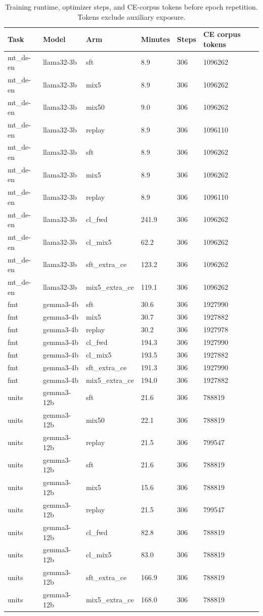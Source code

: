 \begin{table}[t]
\centering\small
\begin{tabular}{llllll}
\toprule
Task & Model & Arm & Minutes & Steps & CE corpus tokens \\
\midrule
mt\_de-en & llama32-3b & sft & 8.9 & 306 & 1096262 \\
mt\_de-en & llama32-3b & mix5 & 8.9 & 306 & 1096262 \\
mt\_de-en & llama32-3b & mix50 & 9.0 & 306 & 1096262 \\
mt\_de-en & llama32-3b & replay & 8.9 & 306 & 1096110 \\
mt\_de-en & llama32-3b & sft & 8.9 & 306 & 1096262 \\
mt\_de-en & llama32-3b & mix5 & 8.9 & 306 & 1096262 \\
mt\_de-en & llama32-3b & replay & 8.9 & 306 & 1096110 \\
mt\_de-en & llama32-3b & cl\_fwd & 241.9 & 306 & 1096262 \\
mt\_de-en & llama32-3b & cl\_mix5 & 62.2 & 306 & 1096262 \\
mt\_de-en & llama32-3b & sft\_extra\_ce & 123.2 & 306 & 1096262 \\
mt\_de-en & llama32-3b & mix5\_extra\_ce & 119.1 & 306 & 1096262 \\
fmt & gemma3-4b & sft & 30.6 & 306 & 1927990 \\
fmt & gemma3-4b & mix5 & 30.7 & 306 & 1927882 \\
fmt & gemma3-4b & replay & 30.2 & 306 & 1927978 \\
fmt & gemma3-4b & cl\_fwd & 194.3 & 306 & 1927990 \\
fmt & gemma3-4b & cl\_mix5 & 193.5 & 306 & 1927882 \\
fmt & gemma3-4b & sft\_extra\_ce & 191.3 & 306 & 1927990 \\
fmt & gemma3-4b & mix5\_extra\_ce & 194.0 & 306 & 1927882 \\
units & gemma3-12b & sft & 21.6 & 306 & 788819 \\
units & gemma3-12b & mix50 & 22.1 & 306 & 788819 \\
units & gemma3-12b & replay & 21.5 & 306 & 799547 \\
units & gemma3-12b & sft & 21.6 & 306 & 788819 \\
units & gemma3-12b & mix5 & 15.6 & 306 & 788819 \\
units & gemma3-12b & replay & 21.5 & 306 & 799547 \\
units & gemma3-12b & cl\_fwd & 82.8 & 306 & 788819 \\
units & gemma3-12b & cl\_mix5 & 83.0 & 306 & 788819 \\
units & gemma3-12b & sft\_extra\_ce & 166.9 & 306 & 788819 \\
units & gemma3-12b & mix5\_extra\_ce & 168.0 & 306 & 788819 \\
\bottomrule
\end{tabular}
\caption{Training runtime, optimizer steps, and CE-corpus tokens before epoch repetition. Tokens exclude auxiliary exposure.}
\label{tab:preservation-costs}
\end{table}
